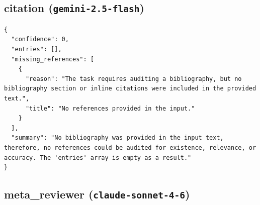 \documentclass[11pt]{article}
\begin{document}
\subsection*{citation (\texttt{gemini-2.5-flash})}
\begin{verbatim}
{
  "confidence": 0,
  "entries": [],
  "missing_references": [
    {
      "reason": "The task requires auditing a bibliography, but no bibliography section or inline citations were included in the provided text.",
      "title": "No references provided in the input."
    }
  ],
  "summary": "No bibliography was provided in the input text, therefore, no references could be audited for existence, relevance, or accuracy. The 'entries' array is empty as a result."
}
\end{verbatim}

\subsection*{meta_reviewer (\texttt{claude-sonnet-4-6})}
\end{document}
